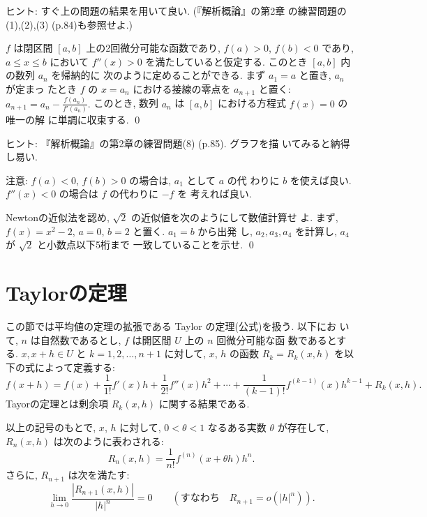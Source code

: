 \documentclass[12pt,twoside]{jarticle}
\begin{document}
\noindent ヒント: すぐ上の問題の結果を用いて良い. (『解析概論』の第2章
の練習問題の(1),(2),(3) (p.84)も参照せよ.)

\begin{question}[Newtonの近似法]\qstar{*}
  $f$ は閉区間 $[a,b]$ 上の2回微分可能な函数であり, %
  $f(a) > 0$, $f(b) < 0$ であり, $a\le x \le b$ において $f''(x) > 0$ %
  を満たしていると仮定する. このとき $[a,b]$ 内の数列 $a_n$ を帰納的に
  次のように定めることができる.  まず $a_1 = a$ と置き, $a_n$ が定まっ
  たとき $f$ の $x=a_n$ における接線の零点を $a_{n+1}$ と置く: %
  \(\displaystyle
    a_{n+1} = a_n - \frac{f(a_n)}{f'(a_n)}.
  \) %
  このとき, 数列 $a_n$ は $[a,b]$ における方程式 $f(x) = 0$ の唯一の解
  に単調に収束する.  \qed
\end{question}

\noindent ヒント: 『解析概論』の第2章の練習問題(8) (p.85). グラフを描
いてみると納得し易い.

\noindent 注意: $f(a) < 0$, $f(b) > 0$ の場合は, $a_1$ として $a$ の代
わりに $b$ を使えば良い. $f''(x) < 0$ の場合は $f$ の代わりに $-f$ を
考えれば良い.

\begin{question}
  Newtonの近似法を認め, $\sqrt{2}$ の近似値を次のようにして数値計算せ
  よ. まず, $f(x) = x^2 - 2$, $a=0$, $b=2$ と置く. $a_1 = b$ から出発
  し, $a_2,a_3,a_4$ を計算し, $a_4$ が $\sqrt{2}$ と小数点以下5桁まで
  一致していることを示せ.  \qed
\end{question}


\section{Taylorの定理}

この節では平均値の定理の拡張である Taylor の定理(公式)を扱う. 以下にお
いて, $n$ は自然数であるとし, $f$ は開区間 $U$ 上の $n$ 回微分可能な函
数であるとする. $x, x + h \in U$ と $k = 1,2,\dots,n+1$ に対して, %
$x$, $h$ の函数 $R_k = R_k(x,h)$ を以下の式によって定義する:
\[
    f(x + h)
    = f(x)
    + \frac{1}{1!}     f'(x)        h
    + \frac{1}{2!}     f''(x)       h^2
    + \cdots
    + \frac{1}{(k-1)!} f^{(k-1)}(x) h^{k-1}
    + R_k(x,h).
\]
Tayorの定理とは剰余項 $R_k(x,h)$ に関する結果である.

\begin{Theorem}[Taylorの定理]\label{Th:Taylor1}
  以上の記号のもとで, $x$, $h$ に対して, %
  $0 < \theta < 1$ なるある実数 $\theta$ が存在して, %
  $R_n(x,h)$ は次のように表わされる:
  \[
    R_n(x,h) = \frac{1}{n!} f^{(n)}(x + \theta h) h^n.
  \]%
  さらに, $R_{n+1}$ は次を満たす:
  \[
    \lim_{h\to 0} \frac{|R_{n+1}(x,h)|}{|h|^n} = 0
    \qquad (\text{すなわち}\quad R_{n+1} = o(|h|^n)).
  \]
\end{Theorem}
\end{document}
